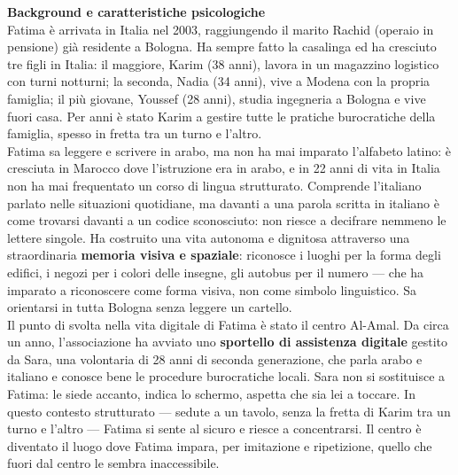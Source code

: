 \documentclass[11pt,a4paper]{article}
\begin{document}
\begin{center}


\begin{tcolorbox}[colback=backgroundColor,colframe=borderColor,arc=2mm]
    \textbf{Background e caratteristiche psicologiche} \\[4pt]
    {\small
    Fatima è arrivata in Italia nel 2003, raggiungendo il marito
    Rachid (operaio in pensione) già residente a Bologna.
    Ha sempre fatto la casalinga ed ha cresciuto tre figli
    in Italia: il maggiore, Karim (38 anni), lavora in un
    magazzino logistico con turni notturni; la seconda,
    Nadia (34 anni), vive a Modena con la propria famiglia;
    il più giovane, Youssef (28 anni), studia ingegneria
    a Bologna e vive fuori casa. Per anni è stato Karim
    a gestire tutte le pratiche burocratiche della famiglia,
    spesso in fretta tra un turno e l'altro. \\[4pt]

    Fatima sa leggere e scrivere in arabo, ma non ha mai
    imparato l'alfabeto latino: è cresciuta in Marocco dove
    l'istruzione era in arabo, e in 22 anni di vita in Italia
    non ha mai frequentato un corso di lingua strutturato.
    Comprende l'italiano parlato nelle situazioni quotidiane,
    ma davanti a una parola scritta in italiano è come
    trovarsi davanti a un codice sconosciuto:
    non riesce a decifrare nemmeno le lettere singole.
    Ha costruito una vita autonoma e dignitosa attraverso
    una straordinaria \textbf{memoria visiva e spaziale}:
    riconosce i luoghi per la forma degli edifici, i negozi
    per i colori delle insegne, gli autobus per il numero ---
    che ha imparato a riconoscere come forma visiva,
    non come simbolo linguistico.
    Sa orientarsi in tutta Bologna senza leggere un cartello. \\[4pt]

    Il punto di svolta nella vita digitale di Fatima
    è stato il centro Al-Amal. Da circa un anno,
    l'associazione ha avviato uno \textbf{sportello
    di assistenza digitale} gestito da Sara, una
    volontaria di 28 anni di seconda generazione,
    che parla arabo e italiano e conosce bene
    le procedure burocratiche locali. Sara non si
    sostituisce a Fatima: le siede accanto, indica
    lo schermo, aspetta che sia lei a toccare.
    In questo contesto strutturato --- sedute a un
    tavolo, senza la fretta di Karim tra un turno
    e l'altro --- Fatima si sente al sicuro e riesce
    a concentrarsi. Il centro è diventato il luogo
    dove Fatima impara, per imitazione e ripetizione,
    quello che fuori dal centro le sembra inaccessibile. \\[4pt]

}
\end{tcolorbox}
\end{center}
\end{document}
